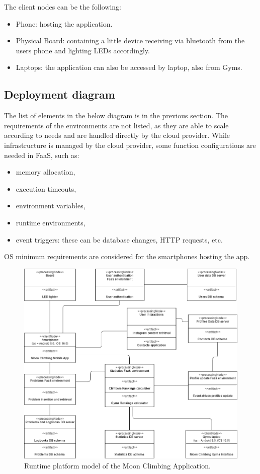 \documentclass{article}
\begin{document}
The client nodes can be the following:
\begin{itemize}
    \item Phone: hosting the application.
    \item Physical Board: containing a little device receiving via bluetooth from the users phone and lighting LEDs accordingly.
    \item Laptops: the application can also be accessed by laptop, also from Gyms.
\end{itemize}

\subsection*{Deployment diagram}

The list of elements in the below diagram is in the previous section. The requirements of the environments are not listed, as they are able to scale according to needs and are handled directly by the cloud provider.
While infrastructure is managed by the cloud provider, some function configurations are needed in FaaS, such as:
\begin{itemize}
    \item memory allocation,
    \item execution timeouts,
    \item environment variables,
    \item runtime environments,
    \item event triggers: these can be database changes, HTTP requests, etc.
\end{itemize}

OS minimum requirements are considered for the smartphones hosting the app.

\begin{figure}[H]
    \centering
    \includegraphics[width=\textwidth]{deployment_UML.png}
    \caption{Runtime platform model of the Moon Climbing Application.}
    \label{fig:trip_system}
\end{figure}
\end{document}
